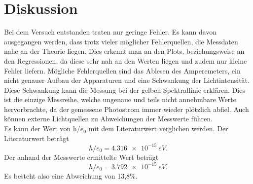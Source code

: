 \section{Diskussion}
Bei dem Versuch entstanden traten nur geringe Fehler. Es kann davon ausgegangen werden, dass trotz vieler möglicher Fehlerquellen, die Messdaten nahe an der Theorie liegen. Dies erkennt man an den Plots, beziehungsweise an den Regressionen, da diese sehr nah an den Werten liegen und zudem nur kleine Fehler liefern. 
Mögliche Fehlerquellen sind das Ablesen des Amperemeters, ein nicht genauer Aufbau der Apparaturen und eine Schwankung der Lichtintensität. Diese Schwankung kann die Messung bei der gelben Spektrallinie erklären. Dies ist die einzige Messreihe, welche ungenaue und teils nicht annehmbare Werte hervorbrachte, da der gemessene Photostrom immer wieder plötzlich abfiel. \*
Auch können externe Lichtquellen zu Abweichungen der Messwerte führen. \\
Es kann der Wert von h/$e_0$ mit dem Literaturwert verglichen werden. Der Literaturwert beträgt
\begin{equation*}
	h/e_0 = \SI{4,316e-15}{eV} .
\end{equation*}
Der anhand der Messwerte ermittelte Wert beträgt
\begin{equation*}
	h/e_0 = \SI{3,792e-15}{eV} .
\end{equation*}
Es besteht also eine Abweichung von 13,8\%.